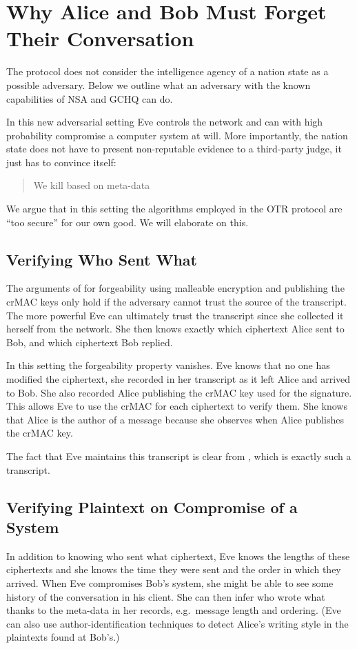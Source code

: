 \section{Why Alice and Bob Must Forget Their Conversation}
\label{sec:otrattacks}

The protocol does not consider the intelligence agency of a nation state as 
a possible adversary.
Below we outline what an adversary with the known capabilities of \ac{NSA} and 
\ac{GCHQ} can do.

In this new adversarial setting Eve controls the network and can with high 
probability compromise a computer system at will.
More importantly, the nation state does not have to present non-reputable 
evidence to a third-party judge, it just has to convince itself: 
\blockcquote{metadatakill}{We kill based on meta-data}.
We argue that in this setting the algorithms employed in the \ac{OTR} protocol 
are \enquote{too secure} for our own good.
We will elaborate on this.

\subsection{Verifying Who Sent What}

The arguments of \citet{otr2004} for forgeability using malleable encryption 
and publishing the \ac{crMAC} keys only hold if the adversary cannot trust the 
source of the transcript.
The more powerful Eve can ultimately trust the transcript since she collected 
it herself from the network.
She then knows exactly which ciphertext Alice sent to Bob, and which ciphertext 
Bob replied.

In this setting the forgeability property vanishes.
Eve knows that no one has modified the ciphertext, she recorded in her 
transcript as it left Alice and arrived to Bob.
She also recorded Alice publishing the \ac{crMAC} key used for the signature.
This allows Eve to use the \ac{crMAC} for each ciphertext to verify them.
She knows that Alice is the author of a message because she observes when Alice 
publishes the \ac{crMAC} key.

The fact that Eve maintains this transcript is clear from \cite{spiegelotr}, 
which is exactly such a transcript.

\subsection{Verifying Plaintext on Compromise of a System}

In addition to knowing who sent what ciphertext, Eve knows the lengths of these 
ciphertexts and she knows the time they were sent and the order in which they 
arrived.
When Eve compromises Bob's system, she might be able to see some history of the 
conversation in his client.
She can then infer who wrote what thanks to the meta-data in her records, 
e.g.~message length and ordering.
(Eve can also use author-identification techniques to detect Alice's writing 
style in the plaintexts found at Bob's.)

